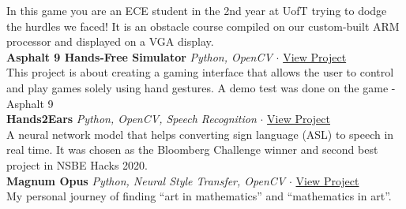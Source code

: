 \documentclass[a4paper]{article}
\begin{document}
In this game you are an ECE student in the 2nd year at UofT trying to dodge the hurdles we faced! It is an obstacle course compiled on our custom-built ARM processor and displayed on a VGA display.\\
\vspace*{2mm}
{\textbf{Asphalt 9 Hands-Free Simulator}} {\sl Python, OpenCV} $\cdot$ \href{https://github.com/pandyah5/asphalt9_OpenCV_Simulation?tab=readme-ov-file}{View Project} \\
This project is about creating a gaming interface that allows the user to control and play games solely using hand gestures. A demo test was done on the game - Asphalt 9\\
\vspace*{2mm}
{\textbf{Hands2Ears}} {\sl Python, OpenCV, Speech Recognition} $\cdot$ \href{https://devpost.com/software/handstoears}{View Project} \\
A neural network model that helps converting sign language (ASL) to speech in real time. It was chosen as the Bloomberg Challenge winner and second best project in NSBE Hacks 2020.\\
\vspace*{2mm}
{\textbf{Magnum Opus}} {\sl Python, Neural Style Transfer, OpenCV} $\cdot$ \href{https://pandyah5.github.io/magnum_opus/pistachio.html}{View Project} \\
My personal journey of finding “art in mathematics” and “mathematics in art”.\\
\vspace*{2mm}
\end{document}
